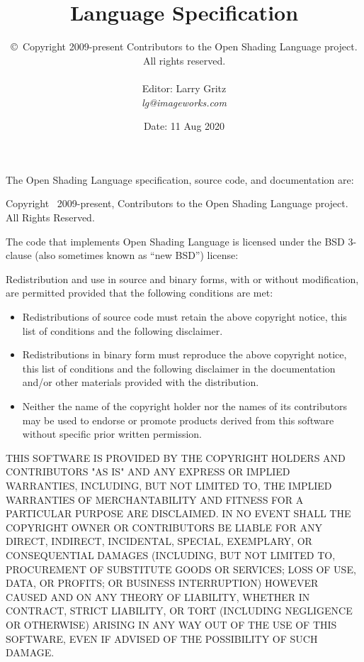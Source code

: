 \documentclass[11pt,letterpaper]{book}
\title{
{\Huge{\bf \product}
{\bf\sffamily \versionnumber} \medskip \\ \huge
Language Specification
} \bigskip }
\author{
\copyright\ Copyright 2009-present Contributors to the Open Shading Language project. \\
All rights reserved.
 \bigskip \\
\vspace{1in} \\
Editor: Larry Gritz \\
\emph{lg@imageworks.com}
}
\date{{\large Date: 11 Aug 2020 \\
}
\bigskip
\bigskip
\bigskip
\bigskip
}
\begin{document}
\frontmatter

\maketitle

\newpage
\label{speccopyr}

\vspace*{0.2in}

\noindent The Open Shading Language specification, source code, and
documentation are:

\vspace*{0.2in}

Copyright \textcopyright\ 2009-present, Contributors to the Open Shading
Language project. All Rights Reserved.

\vspace{0.5in}

The code that implements Open Shading Language is licensed under
the BSD 3-clause (also sometimes known as ``new BSD'') license:

\vspace{0.25in}

Redistribution and use in source and binary forms, with or without
modification, are permitted provided that the following conditions are
met:

\begin{itemize}
\item Redistributions of source code must retain the above copyright
  notice, this list of conditions and the following disclaimer.
\item Redistributions in binary form must reproduce the above copyright
  notice, this list of conditions and the following disclaimer in the
  documentation and/or other materials provided with the distribution.
\item Neither the name of the copyright holder nor the names of its
  contributors may be used to endorse or promote products derived from
  this software without specific prior written permission.
\end{itemize}

THIS SOFTWARE IS PROVIDED BY THE COPYRIGHT HOLDERS AND CONTRIBUTORS
"AS IS" AND ANY EXPRESS OR IMPLIED WARRANTIES, INCLUDING, BUT NOT
LIMITED TO, THE IMPLIED WARRANTIES OF MERCHANTABILITY AND FITNESS FOR
A PARTICULAR PURPOSE ARE DISCLAIMED. IN NO EVENT SHALL THE COPYRIGHT
OWNER OR CONTRIBUTORS BE LIABLE FOR ANY DIRECT, INDIRECT, INCIDENTAL,
SPECIAL, EXEMPLARY, OR CONSEQUENTIAL DAMAGES (INCLUDING, BUT NOT
LIMITED TO, PROCUREMENT OF SUBSTITUTE GOODS OR SERVICES; LOSS OF USE,
DATA, OR PROFITS; OR BUSINESS INTERRUPTION) HOWEVER CAUSED AND ON ANY
THEORY OF LIABILITY, WHETHER IN CONTRACT, STRICT LIABILITY, OR TORT
(INCLUDING NEGLIGENCE OR OTHERWISE) ARISING IN ANY WAY OUT OF THE USE
OF THIS SOFTWARE, EVEN IF ADVISED OF THE POSSIBILITY OF SUCH DAMAGE.
\end{document}
